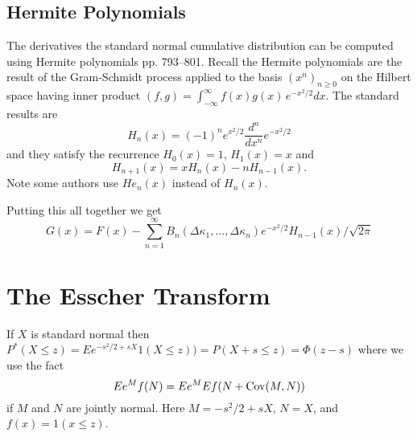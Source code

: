 \documentclass[11pt]{article}
\newcommand{\Cov}{\mathop{\rm{Cov}}}
\theoremstyle{definition}
\begin{document}
\subsection{Hermite Polynomials}
The derivatives the standard normal cumulative distribution 
can be computed using Hermite polynomials\cite{AbrSte1964}
pp. 793--801.
Recall the Hermite polynomials are the result of the Gram-Schmidt
process applied to the basis \((x^n)_{n\ge0}\) on the Hilbert space
having inner product \((f,g) = \int_{-\infty}^\infty f(x)g(x)\,e^{-x^2/2}dx\).
The standard results are
\[
H_n(x) = (-1)^n e^{x^2/2}\frac{d^n}{dx^n}e^{-x^2/2}
\]
and they satisfy the recurrence \(H_0(x) = 1\), \(H_1(x) = x\) and
\[
H_{n+1}(x) = xH_n(x) - n H_{n-1}(x).
\]
Note some authors use \(He_n(x)\) instead of \(H_n(x)\).

Putting this all together we get
\[
G(x) = F(x) - \sum_{n=1}^\infty
B_n(\Delta\kappa_1,\dots,\Delta\kappa_n) e^{-x^2/2}H_{n-1}(x)/\sqrt{2\pi}
\]

%

%

\section{The Esscher Transform}

If \(X\) is standard normal then
\(P^*(X\le z) = Ee^{-s^2/2 + sX} 1(X\le z)) = P(X + s\le z)
= \Phi(z - s)\)
where we use the fact
\[
Ee^M f(N) = Ee^M Ef(N + \Cov(M,N))
\]
if \(M\) and \(N\) are
jointly normal. Here \(M = -s^2/2 + sX\), \(N = X\), and \(f(x) = 1(x\le z)\).
\end{document}
